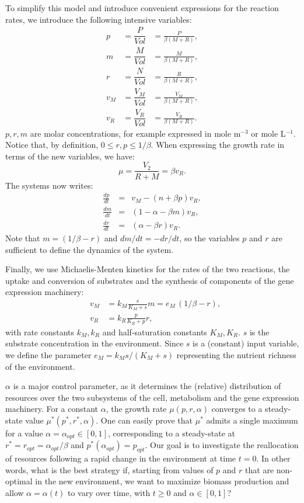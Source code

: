 \documentclass[a4paper, 10pt, conference]{ieeeconf}      %
\begin{document}
To simplify this model and introduce convenient expressions for the reaction rates, we introduce the following intensive variables:
\begin{eqnarray*}
p &= \dfrac{P}{\mathit{Vol}} &= \frac{P}{\beta (M+R)}, \\
m &= \dfrac{M}{\mathit{Vol}} &= \frac{M}{\beta (M+R)},\\
r &= \dfrac{N}{\mathit{Vol}} &= \frac{R}{\beta (M+R)},\\
v_M &= \dfrac{V_M}{\mathit{Vol}} &= \frac{V_M}{\beta (M+R)},\\
v_R &= \dfrac{V_R}{\mathit{Vol}} &= \frac{V_R}{\beta (M+R)}.
\end{eqnarray*}
$p,r,m$ are molar concentrations, for example expressed in mole m$^{-3}$ or mole L$^{-1}$. Notice that, by definition, $0 \leq r, p \leq 1/\beta$. When expressing the growth rate in terms of the new variables, we have:
\[
\mu = \frac{V_2}{R+M} = \beta v_R.
\]
The systems now writes:
\begin{eqnarray}
\frac{dp}{dt} &=& v_M - (n + \beta p) v_R, \label{eq:p} \\
\frac{dm}{dt} &=& (1-\alpha - \beta m) v_R, \label{eq:m} \\ 
\frac{dr}{dt} &=& (\alpha - \beta r) v_R. \label{eq:r}
\end{eqnarray}
Note that $m = (1/\beta - r)$ and $dm/dt = - dr/dt$, so the variables $p$ and $r$ are sufficient to define the dynamics of the system.

Finally, we use Michaelis-Menten kinetics for the rates of the two reactions, the uptake and conversion of substrates and the synthesis of components of the gene expression machinery:
\begin{eqnarray}
&v_M &= k_M \frac{s}{K_M +s} m = e_M \, (1/\beta -r), \\
&v_R &= k_R \frac{p}{K_R + p} r,
\end{eqnarray}
with rate constants $k_M, k_R$ and half-saturation constants $K_M, K_R$.
$s$ is the substrate concentration in the environment.
Since $s$ is a (constant) input variable, we define the parameter $e_M = k_M s / (K_M + s)$ representing the nutrient richness of the environment.

$\alpha$ is a major control parameter, as it determines the (relative) distribution of resources over the two subsystems of the cell, metabolism and the gene expression machinery.
For a constant $\alpha$, the growth rate $\mu(p,r,\alpha)$ converges to a steady-state value $\mu^*(p^*, r^*, \alpha)$. 
One can easily prove that $\mu^*$ admits a single maximum for a value $\alpha = \alpha_{opt} \in [0,1]$, corresponding to a steady-state at $r^* = r_{opt} = \alpha_{opt}/ \beta$ and $p^* (\alpha_{opt}) = p_{opt}$.
Our goal is to investigate the reallocation of resources following a rapid change in the environment at time $t=0$.
In other words, what is the best strategy if, starting from values of $p$ and $r$ that are non-optimal in the new environment, we want to maximize biomass production and allow $\alpha = \alpha(t)$ to vary over time, with $t\geq 0$ and $\alpha \in [0, 1]$?
\end{document}
